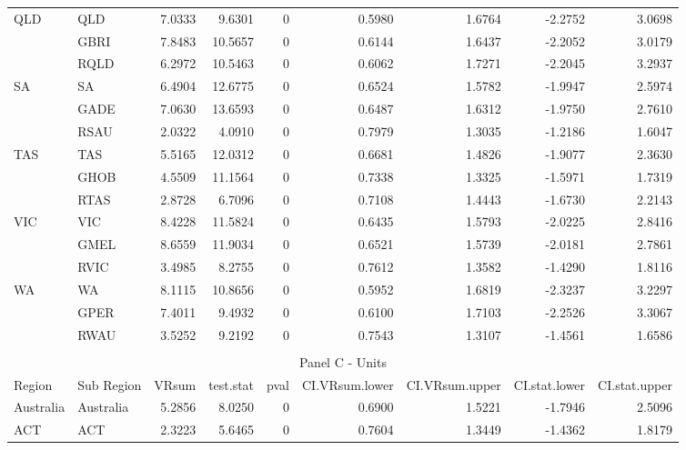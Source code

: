 \begin{table}[htbp]
{\begin{tabular}{llrrrrrrr}
    \multirow{3}[0]{*}{QLD} & QLD   & 7.0333 & 9.6301 & 0     & 0.5980 & 1.6764 & -2.2752 & 3.0698 \\
          & GBRI  & 7.8483 & 10.5657 & 0     & 0.6144 & 1.6437 & -2.2052 & 3.0179 \\
          & RQLD  & 6.2972 & 10.5463 & 0     & 0.6062 & 1.7271 & -2.2045 & 3.2937 \\
    \multirow{3}[0]{*}{SA} & SA    & 6.4904 & 12.6775 & 0     & 0.6524 & 1.5782 & -1.9947 & 2.5974 \\
          & GADE  & 7.0630 & 13.6593 & 0     & 0.6487 & 1.6312 & -1.9750 & 2.7610 \\
          & RSAU  & 2.0322 & 4.0910 & 0     & 0.7979 & 1.3035 & -1.2186 & 1.6047 \\
    \multirow{3}[0]{*}{TAS} & TAS   & 5.5165 & 12.0312 & 0     & 0.6681 & 1.4826 & -1.9077 & 2.3630 \\
          & GHOB  & 4.5509 & 11.1564 & 0     & 0.7338 & 1.3325 & -1.5971 & 1.7319 \\
          & RTAS  & 2.8728 & 6.7096 & 0     & 0.7108 & 1.4443 & -1.6730 & 2.2143 \\
    \multirow{3}[0]{*}{VIC} & VIC   & 8.4228 & 11.5824 & 0     & 0.6435 & 1.5793 & -2.0225 & 2.8416 \\
          & GMEL  & 8.6559 & 11.9034 & 0     & 0.6521 & 1.5739 & -2.0181 & 2.7861 \\
          & RVIC  & 3.4985 & 8.2755 & 0     & 0.7612 & 1.3582 & -1.4290 & 1.8116 \\
    \multirow{3}[1]{*}{WA} & WA    & 8.1115 & 10.8656 & 0     & 0.5952 & 1.6819 & -2.3237 & 3.2297 \\
          & GPER  & 7.4011 & 9.4932 & 0     & 0.6100 & 1.7103 & -2.2526 & 3.3067 \\
          & RWAU  & 3.5252 & 9.2192 & 0     & 0.7543 & 1.3107 & -1.4561 & 1.6586 \\
    \midrule \\
    \multicolumn{9}{c}{Panel C - Units} \\
    \midrule
    Region & Sub Region & \multicolumn{1}{l}{ VRsum} & \multicolumn{1}{l}{ test.stat} & \multicolumn{1}{l}{ pval} & \multicolumn{1}{l}{ CI.VRsum.lower} & \multicolumn{1}{l}{ CI.VRsum.upper} & \multicolumn{1}{l}{ CI.stat.lower} & \multicolumn{1}{l}{ CI.stat.upper} \\
    \midrule
    Australia & Australia & 5.2856 & 8.0250 & 0     & 0.6900 & 1.5221 & -1.7946 & 2.5096 \\
    ACT   & ACT   & 2.3223 & 5.6465 & 0     & 0.7604 & 1.3449 & -1.4362 & 1.8179 \\

\end{tabular}}
\end{table}
